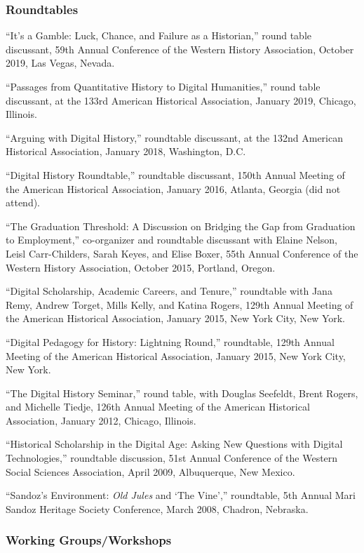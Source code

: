 \subsubsection{Roundtables}\label{roundtables}

``It's a Gamble: Luck, Chance, and Failure as a Historian,'' round table
discussant, 59th Annual Conference of the Western History Association,
October 2019, Las Vegas, Nevada.

``Passages from Quantitative History to Digital Humanities,'' round
table discussant, at the 133rd American Historical Association, January
2019, Chicago, Illinois.

``Arguing with Digital History,'' roundtable discussant, at the 132nd
American Historical Association, January 2018, Washington, D.C.

``Digital History Roundtable,'' roundtable discussant, 150th Annual
Meeting of the American Historical Association, January 2016, Atlanta,
Georgia (did not attend).

``The Graduation Threshold: A Discussion on Bridging the Gap from
Graduation to Employment,'' co-organizer and roundtable discussant with
Elaine Nelson, Leisl Carr-Childers, Sarah Keyes, and Elise Boxer, 55th
Annual Conference of the Western History Association, October 2015,
Portland, Oregon.

``Digital Scholarship, Academic Careers, and Tenure,'' roundtable with
Jana Remy, Andrew Torget, Mills Kelly, and Katina Rogers, 129th Annual
Meeting of the American Historical Association, January 2015, New York
City, New York.

``Digital Pedagogy for History: Lightning Round,'' roundtable, 129th
Annual Meeting of the American Historical Association, January 2015, New
York City, New York.

``The Digital History Seminar,'' round table, with Douglas Seefeldt,
Brent Rogers, and Michelle Tiedje, 126th Annual Meeting of the American
Historical Association, January 2012, Chicago, Illinois.

``Historical Scholarship in the Digital Age: Asking New Questions with
Digital Technologies,'' roundtable discussion, 51st Annual Conference of
the Western Social Sciences Association, April 2009, Albuquerque, New
Mexico.

``Sandoz's Environment: \emph{Old Jules} and `The Vine','' roundtable,
5th Annual Mari Sandoz Heritage Society Conference, March 2008, Chadron,
Nebraska.

\subsubsection{Working Groups/Workshops}\label{working-groupsworkshops}

